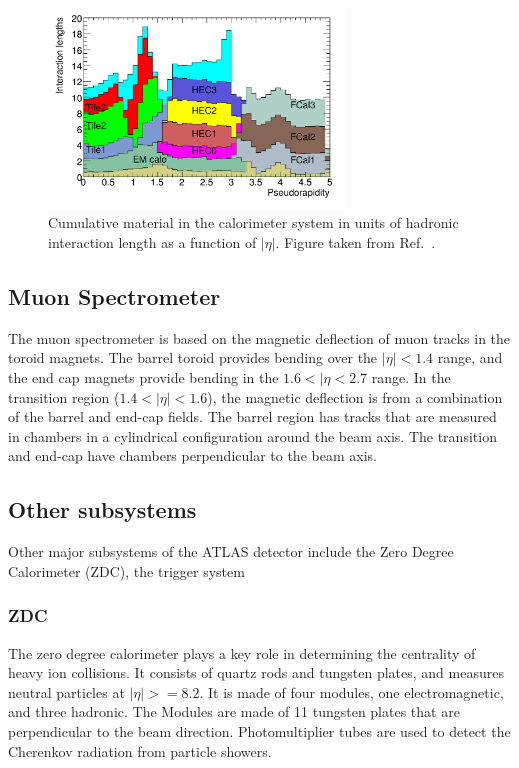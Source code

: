 \begin{figure}[ht]
	\centering
        \includegraphics[width=0.7\textwidth]{figures/setup/interaction_lengths}
          \caption{Cumulative material in the calorimeter system in units of hadronic interaction length as a function of $|\eta|$.
          Figure taken from Ref.~\cite{Aad:2008zzm}.}
          \label{fig:interaction_lenghts}
\end{figure}


\subsection{Muon Spectrometer}
The muon spectrometer is based on the magnetic deflection of muon tracks in the toroid magnets.
The barrel toroid provides bending over the $|\eta| < 1.4$ range, and the end cap magnets provide bending in the $1.6 < |\eta < 2.7$ range.
In the transition region ($1.4 < |\eta| < 1.6$), the magnetic deflection is from a combination of the barrel and end-cap fields.
The barrel region has tracks that are measured in chambers in a cylindrical configuration around the beam axis.
The transition and end-cap have chambers perpendicular to the beam axis.



\subsection{Other subsystems}
Other major subsystems of the ATLAS detector include the Zero Degree Calorimeter (ZDC), the trigger system

\subsubsection{ZDC}
The zero degree calorimeter plays a key role in determining the centrality of heavy ion collisions.
It consists of quartz rods and tungsten plates, and measures neutral particles at $|\eta| >= 8.2$.
It is made of four modules, one electromagnetic, and three hadronic.
The Modules are made of 11 tungsten plates that are perpendicular to the beam direction.
Photomultiplier tubes are used to detect the Cherenkov radiation from particle showers.


